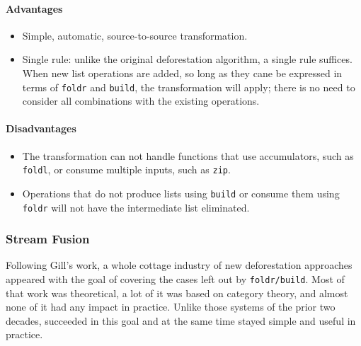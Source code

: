 \paragraph{Advantages}
\begin{itemize}
    \item Simple, automatic, source-to-source transformation.


    \item Single rule: unlike the original deforestation algorithm, a single
        rule suffices. When new list operations are added, so long as they cane
        be expressed in terms of \texttt{foldr} and \texttt{build}, the
        transformation will apply; there is no need to consider all combinations
        with the existing operations.
\end{itemize}

\paragraph{Disadvantages}
\begin{itemize}
    \item The transformation can not handle functions that use accumulators,
        such as \texttt{foldl}, or consume multiple inputs, such as
        \texttt{zip}.

    \item Operations that do not produce lists using \texttt{build} or consume
        them using \texttt{foldr} will not have the intermediate list
        eliminated.
\end{itemize}


\subsubsection{Stream Fusion}

Following Gill's work, a whole cottage industry of new deforestation approaches
appeared with the goal of covering the cases left out by \texttt{foldr/build}.
Most of that work was theoretical, a lot of it was based on category theory, and
almost none of it had any impact in practice. Unlike those systems of the prior
two decades,  \cite{Coutts:2007} succeeded in this goal and
at the same time stayed simple and useful in practice.

